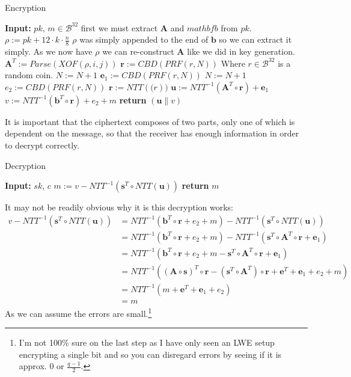 \documentclass[a4paper, 10pt]{article}
\theoremstyle{definition}
\begin{document}
\begin{algorithm}[H]
    \caption{Encryption}
    \begin{algorithmic}
    \State \textbf{Input:} $pk$, $m \in \mathcal{B}^{32}$
    \State first we must extract $\mathbf{A}$ and $mathbf{b}$ from $pk$.
    \State $\rho:=pk+12\cdot k\cdot \frac{n}{8}$ \Comment $\rho$ was simply appended to the end of $\mathbf{b}$ so we can extract it simply. As we now have $\rho$ we can re-construct $\mathbf{A}$ like we did in key generation.
            \State $\mathbf{A}^T:=Parse(XOF(\rho , i, j))$ 
        \EndFor
    \EndFor
        \State $\mathbf{r}:=CBD(PRF(r ,N))$ \Comment Where $r \in \mathcal{B}^{32}$ is a random coin.
        \State $N:=N+1$
    \EndFor
        \State $\mathbf{e}_1:=CBD(PRF(r ,N))$
        \State $N:=N+1$
    \EndFor
    \State $e_2:=CBD(PRF(r, N))$
    \State $\mathbf{r}:=NTT(\mathbf(r))$
    \State $\mathbf{u}:=NTT^{-1}(\mathbf{A}^T\circ \mathbf{r})+\mathbf{e}_1$
    \State $v:=NTT^{-1}(\mathbf{b}^T\circ \mathbf{r})+e_2 + m $
    \State \textbf{return} $(\mathbf{u}\|v)$
    \end{algorithmic}
\end{algorithm}

It is important that the ciphertext composes of two parts, only one of which is dependent on the message, so that the receiver has enough information in order to decrypt correctly.

\begin{algorithm}[H]
    \caption{Decryption}
    \begin{algorithmic}
    \State \textbf{Input:} $sk$, $c$
    \State $m:=v-NTT^{-1}(\mathbf{s}^T\circ NTT(\mathbf{u}))$
    \State \textbf{return} $m$
    \end{algorithmic}
\end{algorithm}

It may not be readily obvious why it is this decryption works:
\begin{align*}
    v-NTT^{-1}(\mathbf{s}^T\circ NTT(\mathbf{u})) &= NTT^{-1}(\mathbf{b}^T\circ \mathbf{r}+e_2+m)-NTT^{-1}(\mathbf{s}^T\circ NTT(\mathbf{u}))\\
    &=NTT^{-1}(\mathbf{b}^T\circ \mathbf{r}+e_2+m)-NTT^{-1}(\mathbf{s}^T\circ \mathbf{A}^T\circ \mathbf{r}+\mathbf{e}_1)\\
    &=NTT^{-1}(\mathbf{b}^T\circ \mathbf{r}+e_2+m-\mathbf{s}^T\circ \mathbf{A}^T\circ \mathbf{r}+\mathbf{e}_1)\\
    &=NTT^{-1}(( \mathbf{A} \circ \mathbf{s})^T \circ \mathbf{r} - (\mathbf{s}^T \circ \mathbf{A} ^T) \circ \mathbf{r} + \mathbf{e} ^T + \mathbf{e}_1 + e_2 + m)\\
    &=NTT^{-1}(m+\mathbf{e}^T+\mathbf{e}_1+e_2)\\
    &=m
\end{align*}
As we can assume the errors are small.\footnote{I'm not 100\% sure on the last step as I have only seen an LWE setup encrypting a single bit and so you can disregard errors by seeing if it is approx. 0 or $\frac{q-1}{2}$.}


\newpage
    
\nocite{*}
\printbibliography
\end{document}
